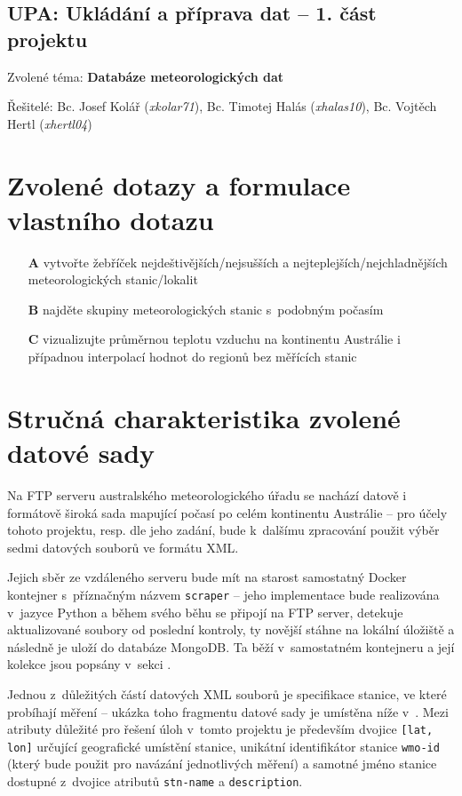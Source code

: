 \documentclass[10pt,a4paper,titlepage]{extarticle}
\begin{document}
\begin{center}
	\section*{UPA: Ukládání a příprava dat -- 1. část projektu}
\end{center}

\large{Zvolené téma: \textbf{Databáze meteorologických dat}}

\large{
	Řešitelé:
	Bc. Josef Kolář (\textit{xkolar71}),
	Bc. Timotej Halás (\textit{xhalas10}),
	Bc. Vojtěch Hertl (\textit{xhertl04})
}%
\section{Zvolené dotazy a formulace vlastního dotazu}
\begin{itemize}
	\item[\textbf{A}] vytvořte žebříček nejdeštivějších/nejsušších a nejteplejších/nejchladnějších meteorologických stanic/lokalit
	\item[\textbf{B}] najděte skupiny meteorologických stanic s~podobným počasím
	\item[\textbf{C}] vizualizujte průměrnou teplotu vzduchu na kontinentu Austrálie i případnou interpolací hodnot
    do regionů bez měřících stanic
\end{itemize}%
\section{Stručná charakteristika zvolené datové sady}
Na FTP serveru australského meteorologického úřadu se nachází datově i formátově široká sada mapující počasí po celém
kontinentu Austrálie -- pro účely tohoto projektu, resp. dle jeho zadání, bude k~dalšímu zpracování použit výběr sedmi
datových souborů ve formátu XML.

Jejich sběr ze vzdáleného serveru bude mít na starost samostatný Docker kontejner s~příznačným názvem
\texttt{scraper} -- jeho implementace bude realizována v~jazyce Python a během svého běhu se připojí na FTP server,
detekuje aktualizované soubory od poslední kontroly, ty novější stáhne na lokální úložiště a následně je uloží
do databáze MongoDB. Ta běží v~samostatném kontejneru a její kolekce jsou popsány v~sekci
.

Jednou z~důležitých částí datových XML souborů je specifikace stanice, ve které probíhají měření -- ukázka toho
fragmentu datové sady je umístěna níže v~. Mezi atributy důležité pro řešení úloh
v~tomto projektu je především dvojice \mbox{\texttt{[lat, lon]}} určující geografické umístění stanice, unikátní
identifikátor stanice \texttt{wmo-id} (který bude použit pro navázání jednotlivých měření) a samotné jméno stanice
dostupné z~dvojice atributů \texttt{stn-name} a \texttt{description}.
\end{document}

